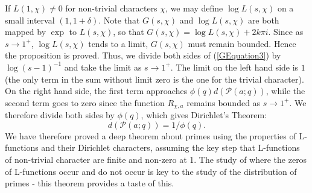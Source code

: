 If $L(1, \chi) \neq 0$ for non-trivial characters $\chi$, we may define $\log L(s, \chi)$ on a small interval $(1, 1 + \delta)$. Note that $G(s, \chi)$ and $\log L(s, \chi)$ are both mapped by $\exp$ to $L(s, \chi)$, so that $G(s, \chi) = \log L(s, \chi) + 2k\pi i $. Since as $s \rightarrow 1^{+}$, $\log L(s, \chi)$ tends to a limit, $G(s, \chi)$ must remain bounded. Hence the proposition is proved. Thus, we divide both sides of (\ref{GEquation3}) by $\log (s - 1)^{-1}$ and take the limit as $s \rightarrow 1^{+}$. The limit on the left hand side is $1$ (the only term in the sum without limit zero is the one for the trivial character). On the right hand side, the first term approaches $\phi(q) d\left(\mathcal{P}(a; q)\right)$, while the second term goes to zero since the function $R_{\chi, a}$ remains bounded as $s \rightarrow 1^{+}$. We therefore divide both sides by $\phi(q)$, which gives Dirichlet's Theorem: 
\begin{equation}
    d\left(\mathcal{P}(a; q)\right) = 1/\phi(q). \nonumber
\end{equation}
We have therefore proved a deep theorem about primes using the properties of L-functions and their Dirichlet characters, assuming the key step that L-functions of non-trivial character are finite and non-zero at 1. The study of where the zeros of L-functions occur and do not occur is key to the study of the distribution of primes - this theorem provides a taste of this. \\
